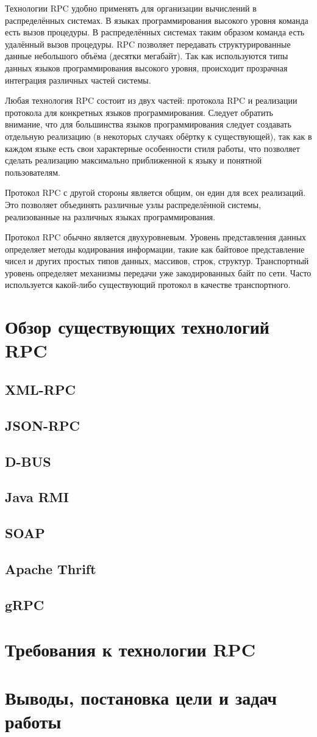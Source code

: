 Технологии RPC удобно применять для организации вычислений в распределённых
системах. В языках программирования высокого уровня команда есть вызов процедуры.
В распределённых системах таким образом команда есть удалённый вызов процедуры.
RPC позволяет передавать структурированные данные небольшого объёма (десятки
мегабайт). Так как используются типы данных языков программирования высокого
уровня, происходит прозрачная интеграция различных частей системы.

Любая технология RPC состоит из двух частей: протокола RPC и
реализации протокола для конкретных языков программирования. Следует обратить
внимание, что для большинства языков программирования следует создавать
отдельную реализацию (в некоторых случаях обёртку к существующей),
так как в каждом языке есть свои характерные особенности стиля работы,
что позволяет сделать реализацию максимально приближенной к языку и понятной
пользователям.

Протокол RPC с другой стороны является общим, он един для всех реализаций.
Это позволяет объединять различные узлы распределённой системы, реализованные
на различных языках программирования.

Протокол RPC обычно является двухуровневым.
Уровень представления данных определяет методы кодирования информации,
такие как байтовое представление чисел и других простых типов данных,
массивов, строк, структур.
Транспортный уровень определяет механизмы передачи уже закодированных байт
по сети. Часто используется какой-либо существующий протокол в качестве
транспортного.

\section{Обзор существующих технологий RPC}
\subsection{XML-RPC}
\subsection{JSON-RPC}
\subsection{D-BUS}
\subsection{Java RMI}
\subsection{SOAP}
\subsection{Apache Thrift}
\subsection{gRPC}

\section{Требования к технологии RPC}

\section{Выводы, постановка цели и задач работы}
